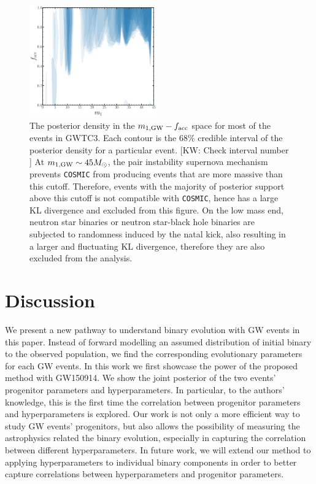 \documentclass[twocolumn]{aastex631}
\newcommand{\kw}[1]{{\color{rb4}[KW: #1 ]}}
\begin{document}
\begin{figure}
\includegraphics[width=0.49\textwidth]{static/GWTC3_f_acc_mass.pdf}
\caption{
    The posterior density in the $m_{1,{\rm GW}}-f_{\rm acc}$ space for most of the events in GWTC3.
    Each contour is the $68\%$ credible interval of the posterior density for a particular event. \kw{Check interval number}
    At $m_{1,{\rm GW}} \sim 45 M_{\odot}$, the pair instability supernova mechanism prevents \texttt{COSMIC} from producing events that are more massive than this cutoff.
    Therefore, events with the majority of posterior support above this cutoff is not compatible with \texttt{COSMIC}, hence has a large KL divergence and excluded from this figure.
    On the low mass end, neutron star binaries or neutron star-black hole binaries are subjected to randomness induced by the natal kick,
    also resulting in a larger and fluctuating KL divergence, therefore they are also excluded from the analysis.
}
\label{fig:GWTC3_f_acc_mass}
\end{figure}

\section{Discussion}
\label{sec:discussion}


We present a new pathway to understand binary evolution with GW events in this paper.
Instead of forward modelling an assumed distribution of initial binary to the observed population,
we find the corresponding evolutionary parameters for each GW events. 
In this work we first showcase the power of the proposed method with GW150914.
We show the joint posterior of the two events' progenitor parameters and hyperparameters.
In particular, to the authors' knowledge, this is the first time the correlation between progenitor parameters and hyperparameters is explored.
Our work is not only a more efficient way to study GW events' progenitors,
but also allows the possibility of measuring the astrophysics related the binary evolution, especially in capturing the correlation between different hyperparameters. 
In future work, we will extend our method to applying hyperparameters to individual binary components in order to better capture correlations between 
hyperparameters and progenitor parameters. 
\end{document}
